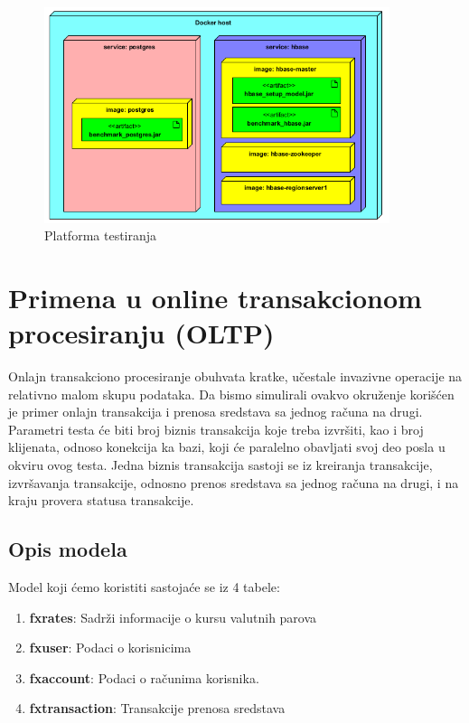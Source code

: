 \documentclass[12pt,oneside]{memoir}
\begin{document}
\begin{figure}[!ht]
  \centering
  \includegraphics[width=0.9\textwidth]{deployment_diagram.png}
  \caption{Platforma testiranja}
  \label{fig:grafikon}
\end{figure}

\pagebreak

\section{Primena u online transakcionom procesiranju (OLTP)}

Onlajn transakciono procesiranje obuhvata kratke, učestale invazivne operacije na relativno malom skupu podataka. Da bismo simulirali ovakvo okruženje korišćen je primer onlajn transakcija i prenosa sredstava sa jednog računa na drugi. Parametri testa će biti broj biznis transakcija koje treba izvršiti, kao i broj klijenata, odnoso konekcija ka bazi, koji će paralelno obavljati svoj deo posla u okviru ovog testa. Jedna biznis transakcija sastoji se iz kreiranja transakcije, izvršavanja transakcije, odnosno prenos sredstava sa jednog računa na drugi, i na kraju provera statusa transakcije. 


\subsection{Opis modela}

Model koji ćemo koristiti sastojaće se iz 4 tabele:

\begin{enumerate}
\item[\textbullet] \textbf{fxrates}: {
	Sadrži informacije o kursu valutnih parova
}
\item[\textbullet] \textbf{fxuser}:{
	Podaci o korisnicima
}
\item[\textbullet] \textbf{fxaccount}:{
	Podaci o računima korisnika.
}
\item[\textbullet] \textbf{fxtransaction}:{
	Transakcije prenosa sredstava
}
\end{enumerate}
\end{document}
